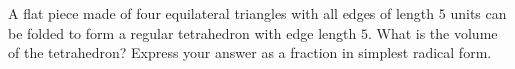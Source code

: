A flat piece made of four equilateral triangles with all edges of length $5$ units can be folded to form a regular tetrahedron with edge length $5$. What is the volume of the tetrahedron? Express your answer as a fraction in simplest radical form.
